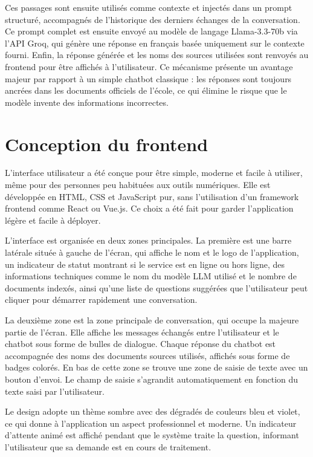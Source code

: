 \documentclass[12pt, a4paper, twoside]{report}
\begin{document}
Ces passages sont ensuite utilisés comme contexte et injectés dans un prompt structuré, accompagnés de l'historique des derniers échanges de la conversation. 
\newpage
Ce prompt complet est ensuite envoyé au modèle de langage Llama-3.3-70b via l'API Groq, qui génère une réponse en français basée uniquement sur le contexte fourni. Enfin, la réponse générée et les noms des sources utilisées sont renvoyés au frontend pour être affichés à l'utilisateur.
Ce mécanisme présente un avantage majeur par rapport à un simple chatbot classique : les réponses sont toujours ancrées dans les documents officiels de l'école, ce qui élimine le risque que le modèle invente des informations incorrectes.
\newpage
\section{Conception du frontend}
L'interface utilisateur a été conçue pour être simple, moderne et facile à utiliser, même pour des personnes peu habituées aux outils numériques. Elle est développée en HTML, CSS et JavaScript pur, sans l'utilisation d'un framework frontend comme React ou Vue.js. Ce choix a été fait pour garder l'application légère et facile à déployer.

L'interface est organisée en deux zones principales. La première est une barre latérale située à gauche de l'écran, qui affiche le nom et le logo de l'application, un indicateur de statut montrant si le service est en ligne ou hors ligne, des informations techniques comme le nom du modèle LLM utilisé et le nombre de documents indexés, ainsi qu'une liste de questions suggérées que l'utilisateur peut cliquer pour démarrer rapidement une conversation.

La deuxième zone est la zone principale de conversation, qui occupe la majeure partie de l'écran. Elle affiche les messages échangés entre l'utilisateur et le chatbot sous forme de bulles de dialogue. Chaque réponse du chatbot est accompagnée des noms des documents sources utilisés, affichés sous forme de badges colorés. En bas de cette zone se trouve une zone de saisie de texte avec un bouton d'envoi. Le champ de saisie s'agrandit automatiquement en fonction du texte saisi par l'utilisateur.

Le design adopte un thème sombre avec des dégradés de couleurs bleu et violet, ce qui donne à l'application un aspect professionnel et moderne. Un indicateur d'attente animé est affiché pendant que le système traite la question, informant l'utilisateur que sa demande est en cours de traitement.
\end{document}
